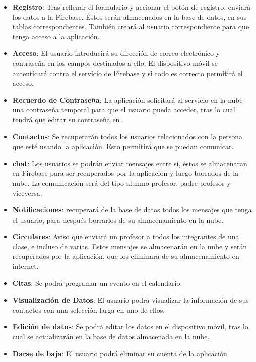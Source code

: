 		\begin{itemize} 
			\item {\bf Registro}: Tras rellenar el formulario y accionar el botón de registro, \CollegeApp enviará los datos a la Firebase. Éstos serán almacenados en la base de datos, en sus tablas correspondientes. También creará al usuario correspondiente para que tenga acceso a la aplicación.
			\item {\bf Acceso}: El usuario introducirá su dirección de correo electrónico y contraseña en los campos destinados a ello. El dispositivo móvil se autenticará contra el servicio de Firebase y si todo es correcto permitirá el acceso.
			\item {\bf Recuerdo de Contraseña}: La aplicación solicitará al servicio en la nube una contraseña temporal para que el usuario pueda acceder, tras lo cual tendrá que editar su contraseña en \CollegeApp.
			\item {\bf Contactos}: Se recuperarán todos los usuarios relacionados con la persona que esté usando la aplicación. Esto permitirá que se puedan comunicar.
			\item {\bf chat}: Los usuarios se podrán enviar mensajes entre sí, éstos se almacenaran en Firebase para ser recuperados por la aplicación y luego borrados de la nube. La comunicación será del tipo alumno-profesor, padre-profesor y viceversa.
			\item {\bf Notificaciones}: \CollegeApp recuperará de la base de datos todos los mensajes que tenga el usuario, para después borrarlos de su almacenamiento en la nube.
			\item {\bf Circulares}: Aviso que enviará un profesor a todos los integrantes de una clase, e incluso de varias. Estos mensajes se almacenarán en la nube y serán recuperados por la aplicación, que los eliminará de su almacenamiento en internet.
			\item {\bf Citas}: Se podrá programar un evento en el calendario.
			\item {\bf Visualización de Datos}: El usuario podrá visualizar la información de sus contactos con una selección larga en uno de ellos.
			\item {\bf Edición de datos}: Se podrá editar los datos en el dispositivo móvil, tras lo cual se actualizarán en la base de datos almacenada en la nube. 
			\item {\bf Darse de baja}: El usuario podrá eliminar su cuenta de la aplicación.
		\end{itemize}

